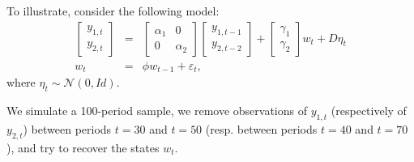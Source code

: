 \documentclass[
  12pt,
]{book}
\theoremstyle{definition}
\theoremstyle{definition}
\theoremstyle{definition}
\theoremstyle{definition}
\theoremstyle{remark}
\begin{document}
To illustrate, consider the following model:
\begin{eqnarray}
\left[\begin{array}{c}
y_{1,t}\\
y_{2,t}
\end{array}\right] & = &
\left[\begin{array}{cc}
\alpha_{1} & 0\\
0 & \alpha_{2}
\end{array}\right]
\left[\begin{array}{c}
y_{1,t-1}\\
y_{2,t-2}
\end{array}\right]+\left[\begin{array}{c}
\gamma_{1}\\
\gamma_{2}
\end{array}\right]w_{t}+ D\eta_t\label{eq_measur}\\
w_{t} & = & \phi w_{t-1}+\varepsilon_{t},\label{eq_trans}
\end{eqnarray}
where \(\eta_t \sim \mathcal{N}(0,Id)\).

We simulate a 100-period sample, we remove observations of \(y_{1,t}\) (respectively of \(y_{2,t}\)) between periods \(t=30\) and \(t=50\) (resp. between periods \(t=40\) and \(t=70\)), and try to recover the states \(w_t\).
\end{document}
